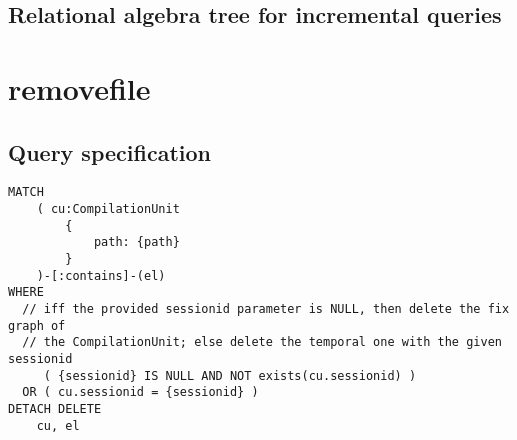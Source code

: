 \subsection*{Relational algebra tree for incremental queries}

\section{removefile}

\subsection*{Query specification}

\begin{lstlisting}
MATCH
	( cu:CompilationUnit
		{
			path: {path}
		}
	)-[:contains]-(el)
WHERE
  // iff the provided sessionid parameter is NULL, then delete the fix graph of
  // the CompilationUnit; else delete the temporal one with the given sessionid
     ( {sessionid} IS NULL AND NOT exists(cu.sessionid) )
  OR ( cu.sessionid = {sessionid} )
DETACH DELETE
	cu, el
\end{lstlisting}

